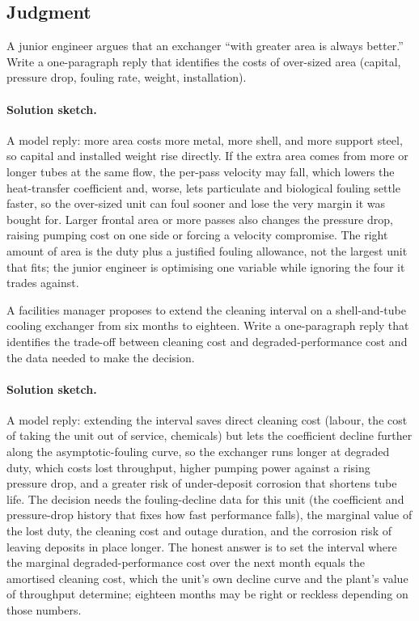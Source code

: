 \subsection*{Judgment}

\begin{exercise}
A junior engineer argues that an exchanger ``with greater area is
always better.'' Write a one-paragraph reply that identifies the
costs of over-sized area (capital, pressure drop, fouling rate,
weight, installation).

\paragraph{Solution sketch.} A model reply: more area costs more metal,
more shell, and more support steel, so capital and installed weight
rise directly. If the extra area comes from more or longer tubes at the
same flow, the per-pass velocity may fall, which lowers the
heat-transfer coefficient and, worse, lets particulate and biological
fouling settle faster, so the over-sized unit can foul sooner and lose
the very margin it was bought for. Larger frontal area or more passes
also changes the pressure drop, raising pumping cost on one side or
forcing a velocity compromise. The right amount of area is the duty
plus a justified fouling allowance, not the largest unit that fits; the
junior engineer is optimising one variable while ignoring the four it
trades against.
\end{exercise}

\begin{exercise}
A facilities manager proposes to extend the cleaning interval on a
shell-and-tube cooling exchanger from six months to eighteen.
Write a one-paragraph reply that identifies the trade-off between
cleaning cost and degraded-performance cost and the data needed to
make the decision.

\paragraph{Solution sketch.} A model reply: extending the interval saves
direct cleaning cost (labour, the cost of taking the unit out of
service, chemicals) but lets the coefficient decline further along the
asymptotic-fouling curve, so the exchanger runs longer at degraded
duty, which costs lost throughput, higher pumping power against a rising
pressure drop, and a greater risk of under-deposit corrosion that
shortens tube life. The decision needs the fouling-decline data for
this unit (the coefficient and pressure-drop history that fixes how
fast performance falls), the marginal value of the lost duty, the
cleaning cost and outage duration, and the corrosion risk of leaving
deposits in place longer. The honest answer is to set the interval
where the marginal degraded-performance cost over the next month equals
the amortised cleaning cost, which the unit's own decline curve and the
plant's value of throughput determine; eighteen months may be right or
reckless depending on those numbers.
\end{exercise}
